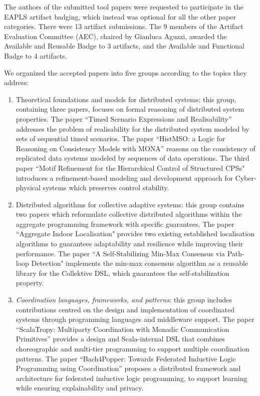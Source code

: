 \documentclass[]{llncs}
\newcommand{\meta}[1]{{\color{blue}#1}}
\begin{document}
The authors of the submitted tool papers were requested to participate in the EAPLS
artifact badging, which instead was optional for all the other paper categories. There
were 13 artifact submissions. The 9 members of the Artifact Evaluation Committee
(AEC), chaired by Gianluca Aguzzi, awarded the Available and Reusable Badge to 3
artifacts, and the Available and Functional Badge to 4 artifacts.


We organized the accepted papers into five groups according to the topics they address:\begin{enumerate}
	\item Theoretical foundations and models for distributed systems: this group, containing three papers, focuses on formal reasoning of distributed system properties. The paper ``Timed Scenario Expressions and Realisability''  addresses the problem of realisability for the distributed system modeled by sets of sequential timed scenarios.  The paper ``HistMSO: a Logic for Reasoning on Consistency Models with MONA'' reasons on the consistency of replicated data systems modeled by sequences of data operations. The third paper ``Motif Refinement for the Hierarchical Control of Structured CPSs" introduces a refinement-based modeling and development approach for Cyber-physical systems which preserves control stability.  
	\item Distributed algorithms for collective adaptive systems: this group contains two papers which reformulate collective distributed algorithms within the aggregate programming framework with specific guarantees. The paper ``Aggregate Indoor Localisation" provides two existing established localisation algorithms to guarantees  adaptability and resilience while improving their performance. The paper ``A Self-Stabilizing Min-Max Consensus via Path-loop Detection" implements the min-max consensus algorithm as a
	reusable library for the Collektive DSL, which guarantees the self-stabilization property. 
	\item \emph{Coordination languages, frameworks, and patterns}: this group includes contributions centred on the design and implementation of coordinated systems through programming languages and middleware support.
	The paper ``ScalaTropy: Multiparty Coordination with Monadic Communication Primitives'' provides a design and Scala-internal DSL that combines choreographic and multi-tier programming to support multiple coordination patterns.
	The paper ``Bach4Popper: Towards Federated Inductive Logic Programming using Coordination'' \meta{proposes a distributed framework and architecture for federated inductive logic programming, to support learning while ensuring explainability and privacy}.

\end{enumerate}
\end{document}
